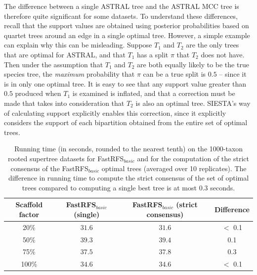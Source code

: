 The difference between a single ASTRAL tree and the ASTRAL MCC tree  is therefore quite significant for some datasets. To understand these differences, recall that  the support values are obtained using posterior probabilities based on quartet trees around an edge in a single optimal tree. 
However, a simple example can explain why this can be misleading. Suppose $T_1$ and $T_2$ are the only trees that are optimal for ASTRAL, and that $T_1$ has a split $\pi$ that $T_2$ does not have.
Then under the assumption that $T_1$ and $T_2$ are both equally likely to be the true species tree, the {\em maximum} probability that $\pi$ can be a true split is $0.5$ -- since it is in only one optimal tree.  
It is easy to see that any support value greater than $0.5$ produced when $T_1$ is examined is inflated, and that a correction must be made that takes into consideration that $T_2$ is also an optimal tree.
SIESTA's way of calculating support explicitly enables this correction, since it explicitly considers the support of each bipartition obtained from the entire set of optimal trees. 


\begin{table}[!ht]
\centering
\begin{tabular}{|c|c|c|c|}
\hline
Scaffold factor & FastRFS$_{basic}$ (single)  & FastRFS$_{basic}$ (strict consensus)& Difference\\
\hline
\hline
 20\%  &$31.6$       &$31.6$ & $<$ 0.1\\
50\% &$39.3$       &$39.4$ & 0.1\\ 
75\% &$37.5$       &$37.8$ & 0.3 \\
100\% &$34.6$       &$34.6$ & $<$ 0.1\\
\hline
\end{tabular}

\caption[Comparison of running times for FastRFS$_{basic}$ with and without SIESTA]{Running time (in seconds, rounded to the nearest tenth) on the 1000-taxon rooted supertree datasets for FastRFS$_{basic}$ and for the computation of the strict consensus of the
FastRFS$_{basic}$ optimal trees (averaged over 10 replicates).  The difference in running time to compute the strict consensus of the set of optimal trees compared to computing a single best tree is at most $0.3$ seconds. }
\label{siesta::table:runningtime-FastRFS$_{basic}$}
\end{table}

